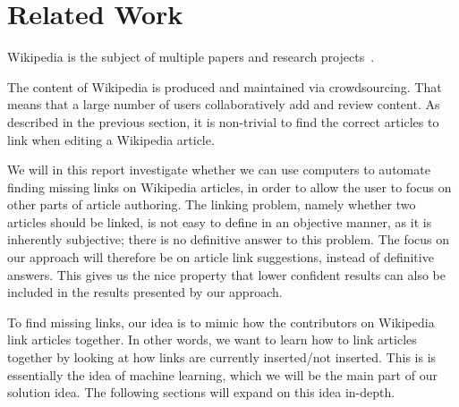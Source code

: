 \section{Related Work}\label{sec:related_work}

Wikipedia is the subject of multiple papers and research projects~\cite{wiki-research-newsletter}.


The content of Wikipedia is produced and maintained via crowdsourcing. That means that a large number of users collaboratively add and review content. As described in the previous section, it is non-trivial to find the correct articles to link when editing a Wikipedia article.

We will in this report investigate whether we can use computers to automate finding missing links on Wikipedia articles, in order to allow the user to focus on other parts of article authoring. The linking problem, namely whether two articles should be linked, is not easy to define in an objective manner, as it is inherently subjective; there is no definitive answer to this problem. The focus on our approach will therefore be on article link suggestions, instead of definitive answers. This gives us the nice property that lower confident results can also be included in the results presented by our approach.

To find missing links, our idea is to mimic how the contributors on Wikipedia link articles together. In other words, we want to learn how to link articles together by looking at how links are currently inserted/not inserted. This is is essentially the idea of machine learning, which we will be the main part of our solution idea. The following sections will expand on this idea in-depth.